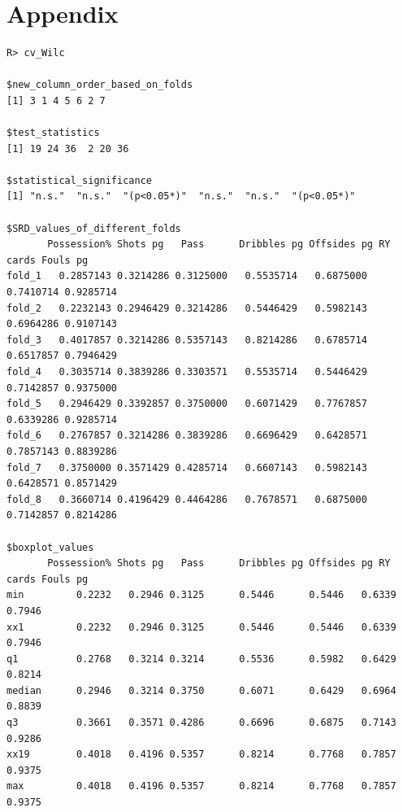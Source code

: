 \appendix
\section*{Appendix}

\begin{verbatim}
R> cv_Wilc

$new_column_order_based_on_folds
[1] 3 1 4 5 6 2 7

$test_statistics
[1] 19 24 36  2 20 36

$statistical_significance
[1] "n.s."  "n.s."  "(p<0.05*)"  "n.s."  "n.s."  "(p<0.05*)"

$SRD_values_of_different_folds
       Possession% Shots pg   Pass      Dribbles pg Offsides pg RY cards Fouls pg
fold_1   0.2857143 0.3214286 0.3125000   0.5535714   0.6875000 0.7410714 0.9285714
fold_2   0.2232143 0.2946429 0.3214286   0.5446429   0.5982143 0.6964286 0.9107143
fold_3   0.4017857 0.3214286 0.5357143   0.8214286   0.6785714 0.6517857 0.7946429
fold_4   0.3035714 0.3839286 0.3303571   0.5535714   0.5446429 0.7142857 0.9375000
fold_5   0.2946429 0.3392857 0.3750000   0.6071429   0.7767857 0.6339286 0.9285714
fold_6   0.2767857 0.3214286 0.3839286   0.6696429   0.6428571 0.7857143 0.8839286
fold_7   0.3750000 0.3571429 0.4285714   0.6607143   0.5982143 0.6428571 0.8571429
fold_8   0.3660714 0.4196429 0.4464286   0.7678571   0.6875000 0.7142857 0.8214286

$boxplot_values
       Possession% Shots pg   Pass      Dribbles pg Offsides pg RY cards Fouls pg
min         0.2232   0.2946 0.3125      0.5446      0.5446   0.6339   0.7946
xx1         0.2232   0.2946 0.3125      0.5446      0.5446   0.6339   0.7946
q1          0.2768   0.3214 0.3214      0.5536      0.5982   0.6429   0.8214
median      0.2946   0.3214 0.3750      0.6071      0.6429   0.6964   0.8839
q3          0.3661   0.3571 0.4286      0.6696      0.6875   0.7143   0.9286
xx19        0.4018   0.4196 0.5357      0.8214      0.7768   0.7857   0.9375
max         0.4018   0.4196 0.5357      0.8214      0.7768   0.7857   0.9375				

\end{verbatim}

\address{Balázs R. Sziklai~\\
  ELTE Centre for Economic and Regional Studies\\
  1097 Tóth Kálmán u. 4\\
  Hungary\\
  Corvinus University of Budapest\\
  1093 Fővám tér 8.\\
  Hungary\\
  }

